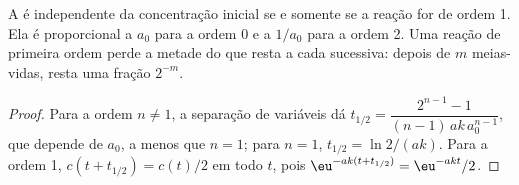 \begin{proposition}\label{prop:b1:rate-laws:half-life-test}
A  é independente da concentração inicial se e somente se a
reação for de ordem 1. Ela é proporcional a $a_0$ para a ordem 0 e a
$1/a_0$ para a ordem 2. Uma reação de primeira ordem perde a metade do
que resta a cada  sucessiva: depois de $m$ meias-vidas, resta
uma fração $2^{-m}$.
\end{proposition}

\begin{proof}
Para a ordem $n \ne 1$, a separação de variáveis dá $t_{1/2} = \dfrac{2^{n-1} -
1}{(n-1)\,ak\,a_0^{n-1}}$, que depende de $a_0$, a menos que $n = 1$; para
$n = 1$, $t_{1/2} = \ln2/(ak)$. Para a ordem 1, $c(t + t_{1/2}) = c(t)/2$
em todo $t$, pois $\eu^{-ak(t + t_{1/2})} = \eu^{-akt}/2$.
\end{proof}

